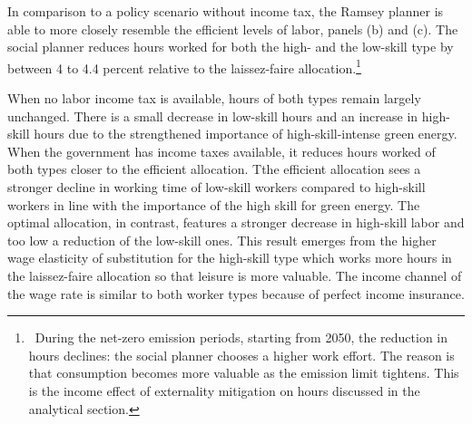 \begin{figure}[h!!!]
\begin{minipage}[]{0.32\textwidth}
	\end{minipage}
\end{figure} 
%
In comparison to a policy scenario without income tax, the Ramsey planner is able to more closely resemble the efficient levels of labor, panels (b) and (c). 
The social planner reduces hours worked for both the high- and the low-skill type by between 4 to 4.4 percent relative to the laissez-faire allocation.\footnote{\ During the net-zero emission periods, starting from 2050, the reduction in hours declines: the social planner chooses a higher work effort. The reason is that consumption becomes more valuable as the emission limit tightens. This is the income effect of  externality mitigation on hours discussed in the analytical section.}

When no labor income tax is available, hours of both types remain largely unchanged. There is a small decrease in low-skill hours and an increase in high-skill hours due to the strengthened importance of high-skill-intense green energy. When the government has income taxes available, it reduces hours worked of both types closer to the efficient allocation. Tthe efficient allocation sees a stronger decline in working time of low-skill workers compared to high-skill workers in line with the importance of the high skill for green energy. The optimal allocation, in contrast, features a stronger decrease in high-skill labor and too low a reduction of the low-skill ones. This result emerges from the higher wage elasticity of substitution for the high-skill type which works more hours in the laissez-faire allocation so that leisure is more valuable. The income channel of the wage rate is similar to both worker types because of perfect income insurance.

